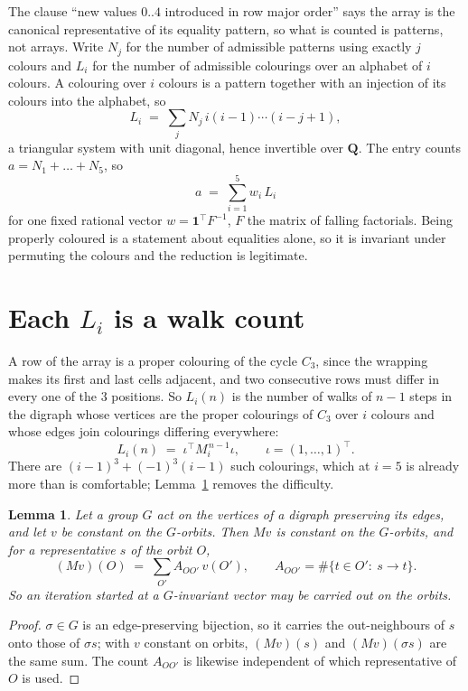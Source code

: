 \documentclass[11pt,a4paper]{article}
\theoremstyle{plain}
\newtheorem{lemma}[theorem]{Lemma}
\theoremstyle{definition}
\begin{document}
The clause ``new values $0..4$ introduced in row major order'' says the array is the
canonical representative of its equality pattern, so what is counted is patterns, not arrays.
Write $N_j$ for the number of admissible patterns using exactly $j$ colours and $L_i$ for the
number of admissible colourings over an alphabet of $i$ colours. A colouring over $i$ colours
is a pattern together with an injection of its colours into the alphabet, so
\[
L_i\;=\;\sum_j N_j\,i(i-1)\cdots(i-j+1),
\]
a triangular system with unit diagonal, hence invertible over $\mathbf{Q}$. The entry counts
$a=N_1+\dots+N_{5}$, so
\[
a\;=\;\sum_{i=1}^{5}w_i\,L_i
\]
for one fixed rational vector $w=\mathbf{1}^{\!\top}F^{-1}$, $F$ the matrix of falling
factorials. Being properly coloured is a statement about equalities alone, so it is invariant
under permuting the colours and the reduction is legitimate.

\section{Each $L_i$ is a walk count}

A row of the array is a proper colouring of the cycle $C_{3}$, since the wrapping makes
its first and last cells adjacent, and two consecutive rows must differ in every one of the
$3$ positions. So $L_i(n)$ is the number of walks of $n-1$ steps in the digraph whose
vertices are the proper colourings of $C_{3}$ over $i$ colours and whose edges join
colourings differing everywhere:
\[
L_i(n)\;=\;\iota^{\!\top}M_i^{\,n-1}\iota ,\qquad \iota=(1,\dots,1)^{\!\top} .
\]
There are $(i-1)^{3}+(-1)^{3}(i-1)$ such colourings, which at $i=5$ is already more
than is comfortable; Lemma~\ref{lem:lump} removes the difficulty.

\begin{lemma}\label{lem:lump}
Let a group $G$ act on the vertices of a digraph preserving its edges, and let $v$ be constant
on the $G$-orbits. Then $Mv$ is constant on the $G$-orbits, and for a representative $s$ of
the orbit $O$,
\[
(Mv)(O)\;=\;\sum_{O'}A_{OO'}\,v(O'),\qquad
A_{OO'}=\#\{t\in O':\ s\to t\} .
\]
So an iteration started at a $G$-invariant vector may be carried out on the orbits.
\end{lemma}

\begin{proof}
$\sigma\in G$ is an edge-preserving bijection, so it carries the out-neighbours of $s$ onto
those of $\sigma s$; with $v$ constant on orbits, $(Mv)(s)$ and $(Mv)(\sigma s)$ are the same
sum. The count $A_{OO'}$ is likewise independent of which representative of $O$ is used.
\end{proof}
\end{document}
